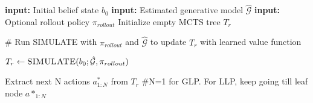 \begin{algorithm}[t!]
\begin{multicols}{2}
\begin{algorithmic}
\STATE {}
\STATE \textbf{input: }Initial belief state $b_0$
\STATE \textbf{input: }Estimated generative model $\hat{\mathcal{G}}$
\STATE \textbf{input: }Optional rollout policy $\pi_{rollout}$
\STATE Initialize empty MCTS tree $T_r$
\REPEAT
    \item \# Run SIMULATE with $\pi_{rollout}$ and $\hat{\mathcal{G}}$ to update $T_r$ with learned value function
    \item $T_r \gets \textsc{SIMULATE}(b_0; \hat{\mathcal{G}}, \pi_{rollout})$
\item Extract next N actions $a^*_{1:N}$ from $T_r$ \#N=1 for GLP. For LLP, keep going till leaf node
\RETURN $a*_{1:N}$
\STATE
\STATE
\STATE

















\end{algorithmic}
\end{multicols}
\end{algorithm}
